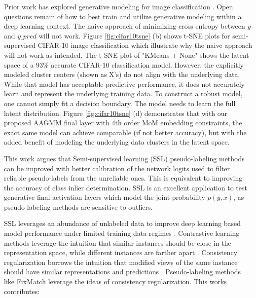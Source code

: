 \documentclass[10pt,twocolumn,letterpaper]{article}
\begin{document}
Prior work has explored generative modeling for image classification \cite{li2019disentangled,kingma2013auto,kingma2019introduction}.
Open questions remain of how to best train and utilize generative modeling within a deep learning context.
The naive approach of minimizing cross entropy between $y$ and $y\_pred$ will not work.
Figure \ref{fig:cifar10tsne} (b) shows t-SNE plots for semi-supervised CIFAR-10 \cite{cifar10} image classification which illustrate why the naive approach will not work as intended. 
The t-SNE\cite{tsne} plot of "KMeans + None" shows the latent space of a $93\%$ accurate CIFAR-10 classification model. 
However, the explicitly modeled cluster centers (shown as X's) do not align with the underlying data.
While that model has acceptable predictive performance, it does not accurately learn and represent the underlying training data.
To construct a robust model, one cannot simply fit a decision boundary.
The model needs to learn the full latent distribution. 
Figure \ref{fig:cifar10tsne} (d) demonstrates that with our proposed AAGMM final layer with 4th order MoM embedding constraints, the exact same model can achieve comparable (if not better accuracy), but with the added benefit of modeling the underlying data clusters in the latent space.


This work argues that Semi-supervised learning (SSL) pseudo-labeling methods can be improved with better calibration of the network logits used to filter reliable pseudo-labels from the unreliable ones. 
This is equivalent to improving the accuracy of class inlier determination.
SSL is an excellent application to test generative final activation layers which model the joint probability $p(y,x)$, as pseudo-labeling methods are sensitive to outliers.

SSL leverages an abundance of unlabeled data to improve deep learning based model performance under limited training data regimes \cite{zhu2022introduction,li2019safe,hady2013semi}.
Contrastive learning methods leverage the intuition that similar instances should be close in the representation space, while different instances are farther apart \cite{yang2022class,li2021comatch}.
Consistency regularization borrows the intuition that modified views of the same instance should have similar representations and predictions \cite{sohn2020fixmatch,lee2022contrastive,zhang2021flexmatch,kim2022conmatch}.
Pseudo-labeling methods like FixMatch \cite{sohn2020fixmatch} leverage the ideas of consistency regularization.
This works contributes:
\end{document}

